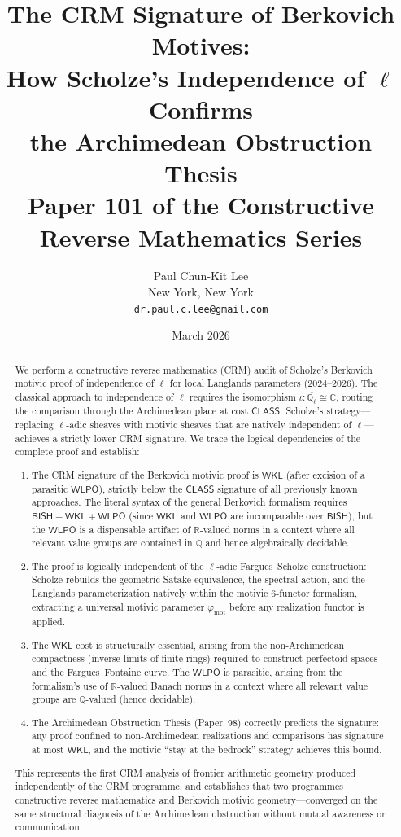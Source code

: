 \documentclass[11pt,a4paper]{article}
\title{\textbf{The CRM Signature of Berkovich Motives:\\
How Scholze's Independence of $\ell$ Confirms\\
the Archimedean Obstruction Thesis}\\[6pt]
\large Paper 101 of the Constructive Reverse Mathematics Series}
\author{Paul Chun-Kit Lee\\
\small New York, New York\\
\small\texttt{dr.paul.c.lee@gmail.com}}
\date{March 2026}
\theoremstyle{plain}
\theoremstyle{definition}
\newcommand{\BISH}{\textsf{BISH}}
\newcommand{\WKL}{\textsf{WKL}}
\newcommand{\WLPO}{\textsf{WLPO}}
\newcommand{\CLASS}{\textsf{CLASS}}
\newcommand{\Q}{\mathbb{Q}}
\newcommand{\R}{\mathbb{R}}
\newcommand{\C}{\mathbb{C}}
\begin{document}
\maketitle

\begin{abstract}
We perform a constructive reverse mathematics (CRM) audit of Scholze's Berkovich motivic proof of independence of $\ell$ for local Langlands parameters (2024--2026). The classical approach to independence of $\ell$ requires the isomorphism $\iota: \overline{\Q_\ell} \cong \C$, routing the comparison through the Archimedean place at cost $\CLASS$. Scholze's strategy---replacing $\ell$-adic sheaves with motivic sheaves that are natively independent of $\ell$---achieves a strictly lower CRM signature. We trace the logical dependencies of the complete proof and establish:

\begin{enumerate}[label=(\roman*)]
\item The CRM signature of the Berkovich motivic proof is $\WKL$ (after excision of a parasitic $\WLPO$), strictly below the $\CLASS$ signature of all previously known approaches. The literal syntax of the general Berkovich formalism requires $\BISH + \WKL + \WLPO$ (since $\WKL$ and $\WLPO$ are incomparable over $\BISH$), but the $\WLPO$ is a dispensable artifact of $\R$-valued norms in a context where all relevant value groups are contained in $\Q$ and hence algebraically decidable.
\item The proof is logically independent of the $\ell$-adic Fargues--Scholze construction: Scholze rebuilds the geometric Satake equivalence, the spectral action, and the Langlands parameterization natively within the motivic 6-functor formalism, extracting a universal motivic parameter $\varphi_{\mathrm{mot}}$ before any realization functor is applied.
\item The $\WKL$ cost is structurally essential, arising from the non-Archimedean compactness (inverse limits of finite rings) required to construct perfectoid spaces and the Fargues--Fontaine curve. The $\WLPO$ is parasitic, arising from the formalism's use of $\R$-valued Banach norms in a context where all relevant value groups are $\Q$-valued (hence decidable).
\item The Archimedean Obstruction Thesis (Paper~98) correctly predicts the signature: any proof confined to non-Archimedean realizations and comparisons has signature at most $\WKL$, and the motivic ``stay at the bedrock'' strategy achieves this bound.
\end{enumerate}

This represents the first CRM analysis of frontier arithmetic geometry produced independently of the CRM programme, and establishes that two programmes---constructive reverse mathematics and Berkovich motivic geometry---converged on the same structural diagnosis of the Archimedean obstruction without mutual awareness or communication.
\end{abstract}
\end{document}
